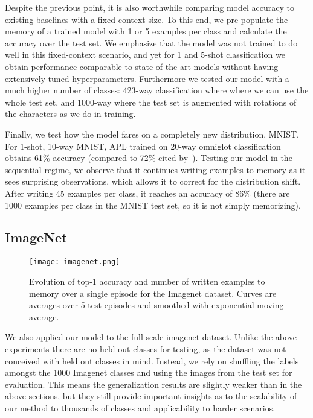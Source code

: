 \documentclass{article} \usepackage{iclr2019_conference,times}
\begin{document}
Despite the previous point, it is also worthwhile comparing model accuracy to existing baselines with a fixed context size. To this end, we pre-populate the memory of a trained model with 1 or 5 examples per class and calculate the accuracy over the test set. We emphasize that the model was not trained to do well in this fixed-context scenario, and yet for 1 and 5-shot classification we obtain performance comparable to state-of-the-art models without having extensively tuned hyperparameters. Furthermore we tested our model with a much higher number of classes: 423-way classification where where we can use the whole test set, and 1000-way where the test set is augmented with rotations of the characters as we do in training.

Finally, we test how the model fares on a completely new distribution, MNIST. For 1-shot, 10-way MNIST, APL trained on 20-way omniglot classification obtains 61\% accuracy (compared to 72\% cited by~\citep{vinyals2016matching}). Testing our model in the sequential regime, we observe that it continues writing examples to memory as it sees surprising observations, which allows it to correct for the distribution shift. After writing 45 examples per class, it reaches an accuracy of 86\% (there are 1000 examples per class in the MNIST test set, so it is not simply memorizing).











\subsection{ImageNet}

\begin{figure}[ht]
\begin{center}
\texttt{[image: imagenet.png]}
\end{center}
\caption{Evolution of top-1 accuracy and number of written examples to memory over a single episode for the Imagenet dataset. Curves are averages over 5 test episodes and smoothed with exponential moving average.}
\end{figure}

We also applied our model to the full scale imagenet dataset. Unlike the above experiments there are no held out classes for testing, as the dataset was not conceived with held out classes in mind. Instead, we rely on shuffling the labels amongst the 1000 Imagenet classes and using the images from the test set for evaluation. This means the generalization results are slightly weaker than in the above sections, but they still provide important insights as to the scalability of our method to thousands of classes and applicability to harder scenarios.
\end{document}
